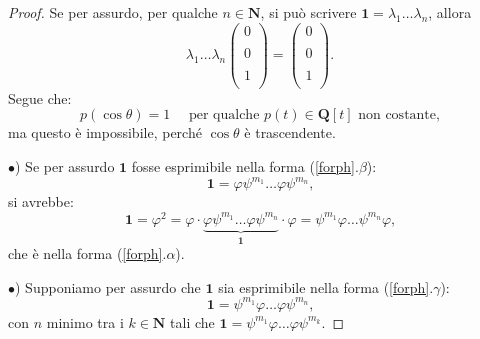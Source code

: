 \documentclass[a4paper,oneside,11pt]{book}
\theoremstyle{definition} \newtheorem{Def}{Definizione}
\theoremstyle{plain} \newtheorem{teo}{Teorema}
\theoremstyle{plain} \newtheorem{cor}[teo]{Corollario}
\theoremstyle{definition} \newtheorem{lem}[teo]{Lemma}
\theoremstyle{plain} \newtheorem{pro}[teo]{Proposizione}
\begin{document}
\begin{proof}
		Se per assurdo, per qualche $n \in \mathbf{N}$, si può scrivere $\mathbf{1} = \lambda_1 \dots \lambda_n$, allora
		\begin{equation*}
			\lambda_1 \dots \lambda_n \begin{pmatrix}
				0\\ \\
				0\\ \\
				1\\
			\end{pmatrix} = \begin{pmatrix}
				0\\ \\
				0\\ \\
				1\\
			\end{pmatrix} \text{.}
		\end{equation*}
		Segue che:		
		\begin{equation*}
			p(\cos\theta) = 1 \quad \text{ per qualche $p(t) \in \mathbf{Q}[t]$ non costante,}
		\end{equation*}
		ma questo è impossibile, perché $\cos\theta$ è trascendente. \lightning
		
		$\bullet$) Se per assurdo $\mathbf{1}$ fosse esprimibile nella forma (\ref{forph}.$\beta$):
		\begin{equation*}
			\mathbf{1} = \varphi \psi^{m_1} \dots \varphi \psi^{m_n} \text{,}
		\end{equation*}
		si avrebbe:
		\begin{equation*}
			\mathbf{1} = \varphi^2 = \varphi \cdot \underbrace{\varphi \psi^{m_1} \dots \varphi\psi^{m_n}}_\mathbf{1} \cdot \varphi = \psi^{m_1} \varphi \dots \psi^{m_n} \varphi \text{,}
		\end{equation*}
		che è nella forma (\ref{forph}.$\alpha$). \lightning
		
		$\bullet$) Supponiamo per assurdo che $\mathbf{1}$ sia esprimibile nella forma (\ref{forph}.$\gamma$):
		\begin{equation*}
			\mathbf{1} = \psi^{m_1}\varphi \dots \varphi\psi^{m_n} \text{,}
		\end{equation*}
		con $n$ minimo tra i $k \in \mathbf{N}$ tali che $\mathbf{1} = \psi^{m_1}\varphi \dots \varphi\psi^{m_k}$.
		

\end{proof}
\end{document}
